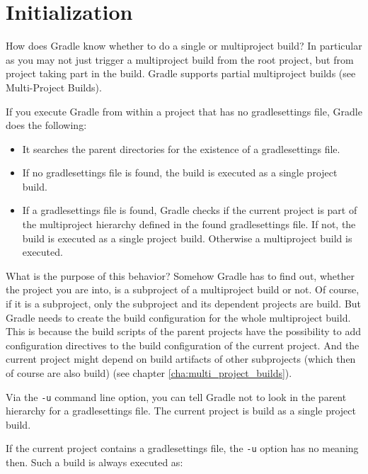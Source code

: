 \section{Initialization} %
\label{sec:initialization}
How does Gradle know whether to do a single or multiproject build? In particular as you may not just trigger a multiproject build from the root project, but from project taking part in the build. Gradle supports partial multiproject builds (see Multi-Project Builds).

If you execute Gradle from within a project that has no gradlesettings file, Gradle does the following:
\begin{itemize}
	\item It searches the parent directories for the existence of a gradlesettings file.
	\item If no gradlesettings file is found, the build is executed as a single project build.
    \item If a gradlesettings file is found, Gradle checks if the current project is part of the multiproject hierarchy defined in the found gradlesettings file. If not, the build is executed as a single project build. Otherwise a multiproject build is executed.
\end{itemize}
What is the purpose of this behavior? Somehow Gradle has to find out, whether the project you are into, is a subproject of a multiproject build or not. Of course, if it is a subproject, only the subproject and its dependent projects are build. But Gradle needs to create the build configuration for the whole multiproject build. This is because the build scripts of the parent projects have the possibility to add configuration directives to the build configuration of the current project. And the current project might depend on build artifacts of other subprojects (which then of course are also build) (see chapter \ref{cha:multi_project_builds}).

Via the \texttt{-u} command line option, you can tell Gradle not to look in the parent hierarchy for a gradlesettings file. The current project is build as a single project build.

If the current project contains a gradlesettings file, the \texttt{-u} option has no meaning then. Such a build is always executed as:

